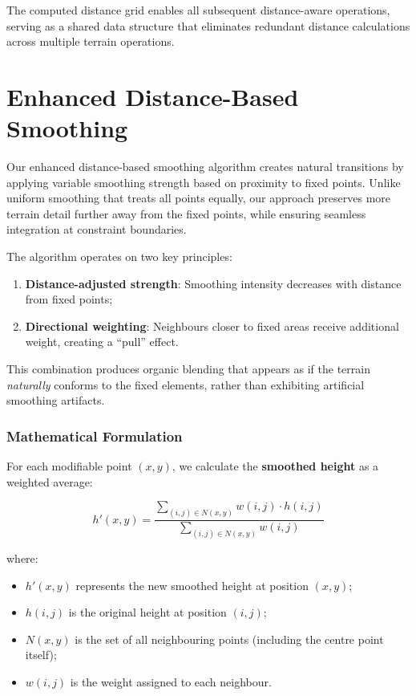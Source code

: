The computed distance grid enables all subsequent distance-aware operations, serving as a shared data structure that eliminates redundant distance calculations across multiple terrain operations.

\section{Enhanced Distance-Based Smoothing}
\label{edbs}

Our enhanced distance-based smoothing algorithm creates natural transitions by applying variable smoothing strength based on proximity to fixed points. Unlike uniform smoothing that treats all points equally, our approach preserves more terrain detail further away from the fixed points, while ensuring seamless integration at constraint boundaries.

The algorithm operates on two key principles:

\begin{enumerate}
    \item \textbf{Distance-adjusted strength}: Smoothing intensity decreases with distance from fixed points;
    \item \textbf{Directional weighting}: Neighbours closer to fixed areas receive additional weight, creating a ``pull'' effect.
\end{enumerate}

This combination produces organic blending that appears as if the terrain \textit{naturally} conforms to the fixed elements, rather than exhibiting artificial smoothing artifacts.

\subsubsection{Mathematical Formulation}
\label{edbs_math}

For each modifiable point $(x, y)$, we calculate the \textbf{smoothed height} as a weighted average:

\[h'(x, y) = \frac{\sum_{(i,j) \in N(x,y)} w(i,j) \cdot h(i,j)}{\sum_{(i,j) \in N(x,y)} w(i,j)}
\]

where:

\begin{itemize}
    \item $h'(x,y)$ represents the new smoothed height at position $(x,y)$;
    \item $h(i,j)$ is the original height at position $(i,j)$;
    \item $N(x,y)$ is the set of all neighbouring points (including the centre point itself);
    \item $w(i,j)$ is the weight assigned to each neighbour.
\end{itemize}
 

